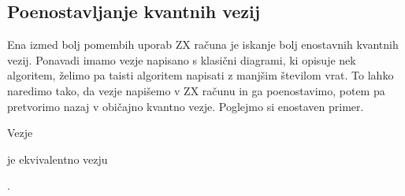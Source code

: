 \documentclass[mat1]{fmfdelo}
\begin{document}
\subsection{Poenostavljanje kvantnih vezij}
Ena izmed bolj pomembih uporab ZX računa je iskanje bolj enostavnih kvantnih vezij. Ponavadi imamo vezje napisano s klasični diagrami, ki opisuje nek algoritem, želimo pa taisti algoritem napisati z manjšim številom vrat. To lahko naredimo tako, da vezje napišemo v ZX računu in ga poenostavimo, potem pa pretvorimo nazaj v običajno kvantno vezje. Poglejmo si enostaven primer.
\begin{izrek}
    Vezje
    \begin{center}
    \end{center}
    je ekvivalentno vezju
    \begin{center}
    \end{center}.
\end{izrek}
\end{document}
